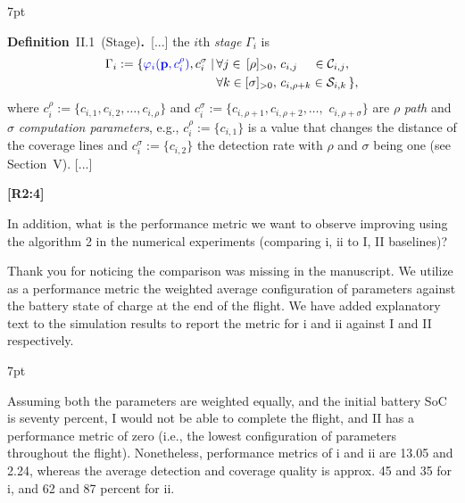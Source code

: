 \documentclass[10pt]{letter}
\newenvironment{formal}{%
  \def\FrameCommand{%
    \hspace{1pt}%
    {\color{red}\vrule width 2pt}%
    {\color{formalshade}\vrule width 4pt}%
    \colorbox{formalshade}%
  }%
  \MakeFramed{\advance\hsize-\width\FrameRestore}%
  \noindent\hspace{-4.55pt}%
  \begin{adjustwidth}{}{7pt}%
  \vspace{2pt}\vspace{2pt}%
}
{%
  \vspace{2pt}\end{adjustwidth}\endMakeFramed%
}
\begin{document}
{  \begin{formal}
    \color{black} 
    \textbf{Definition}~II.1~(Stage)\textbf{.}~[...] the $i$th \emph{stage} $\Gamma_i$ %
      is
    \begin{equation*}\begin{split}
        \Gamma_i:=\{{\color{blue}\varphi_i(\mathbf{p}%
        ,c_i^\rho)},c_i^\sigma\mid
        \,&\forall j\in\,[\rho]_{>0},\,c_{i,j}\,\,\,\,\,\,\,\in\mathcal{C}_{i,j},\,\\
          &\forall k\in[\sigma]_{>0},\,c_{i,\rho+k}\in\mathcal{S}_{i,k}\,\},
    \end{split}\end{equation*}
    where $c_i^\rho${\color{blue}$:=\{c_{i,1},c_{i,2},\dots,c_{i,\rho}\}$} and $c_i^\sigma${\color{blue}$:=\{c_{i,\rho+1},c_{i,\rho+2},\dots,$ $c_{i,\rho+\sigma}\}$} are $\rho$ \emph{path} and $\sigma$ \emph{computation parameters}{\color{blue}, e.g., $c_i^\rho:=\{c_{i,1}\}$ is a value that changes the distance of the coverage lines and $c^\sigma_i:=\{c_{i,2}\}$ the detection rate with $\rho$ and $\sigma$ being one (see Section~{\color{red}V})}. [...]
    \vspace*{1ex}
  \end{formal}



  }

  {\hspace*{-4.5em}\textbf{[R2:4]}\vspace*{-1.9em}}

  In addition, what is the performance metric we want to observe improving using the algorithm 2 in the numerical experiments (comparing i, ii to I, II baselines)? 
  
  {\color{blue} 
  
  {\hspace*{-4.5em}{[R2:4]}\vspace*{-1.9em}}

  Thank you for noticing the comparison was missing in the manuscript. We utilize as a performance metric the weighted average configuration of parameters against the battery state of charge at the end of the flight. We have added explanatory text to the simulation results to report the metric for i and ii against I and II respectively.

  \begin{formal}
    {\color{blue}
Assuming both the parameters are weighted equally, and the initial battery SoC is seventy percent, {\color{red}I} would not be able to complete the flight, and {\color{red}II} has a performance metric of zero (i.e., the lowest configuration of parameters throughout the flight).
Nonetheless, performance metrics of {\color{red}i} and {\color{red}ii} are 13.05 and 2.24, whereas the average detection and coverage quality is approx. 45 and 35 for {\color{red}i}, and 62 and 87 percent for {\color{red}ii}.}  
    \vspace*{1ex}
  \end{formal}
  }
\end{document}

